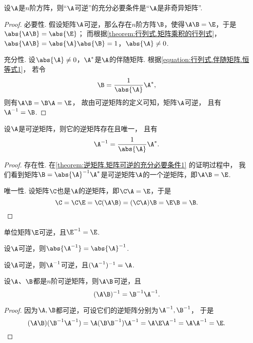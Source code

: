 \begin{theorem}\label{theorem:逆矩阵.矩阵可逆的充分必要条件1}
设\(\A\)是\(n\)阶方阵，则“\(\A\)可逆”的充分必要条件是“\(\A\)是非奇异矩阵”.
\begin{proof}
必要性.
假设矩阵\(\A\)可逆，那么存在\(n\)阶方阵\(\B\)，使得\(\A\B=\E\)，于是\(\abs{\A\B}=\abs{\E}\)；
而根据\cref{theorem:行列式.矩阵乘积的行列式}，
\(\abs{\A\B}=\abs{\A}\abs{\B}=1\)，\(\abs{\A}\neq0\).

充分性.
设\(\abs{\A}\neq0\)，\(\A^*\)是\(\A\)的伴随矩阵.
根据\cref{equation:行列式.伴随矩阵.恒等式1}，
若令\[
	\B=\frac{1}{\abs{\A}} \A^*,
\]
则有\(\A\B = \B\A = \E\)，
故由可逆矩阵的定义可知，矩阵\(\A\)可逆，
且有\(\A^{-1} = \B\).
\end{proof}
\end{theorem}

\begin{property}\label{theorem:逆矩阵.逆矩阵的唯一性}
设\(\A\)是可逆矩阵，则它的逆矩阵存在且唯一，
且有\begin{equation}
	\A^{-1}=\frac{1}{\abs{\A}}\A^*.
\end{equation}
\begin{proof}
存在性.
在\cref{theorem:逆矩阵.矩阵可逆的充分必要条件1} 的证明过程中，
我们看到矩阵\(\B=\abs{\A}^{-1} \A^*\)是可逆矩阵\(\A\)的一个逆矩阵，即\(\A\B=\E\).

唯一性.
设矩阵\(\C\)也是\(\A\)的逆矩阵，即\(\C\A=\E\)，于是\[
	\C=\C\E=\C(\A\B)=(\C\A)\B=\E\B=\B.
	\qedhere
\]
\end{proof}
\end{property}

\begin{property}\label{theorem:逆矩阵.单位矩阵可逆}
单位矩阵\(\E\)可逆，且\(\E^{-1}=\E\).
\end{property}

\begin{property}\label{theorem:逆矩阵.逆矩阵的行列式}
设\(\A\)可逆，则\(\abs{\A^{-1}}=\abs{\A}^{-1}\).
\end{property}

\begin{property}\label{theorem:逆矩阵.逆矩阵的逆}
设\(\A\)可逆，则\(\A^{-1}\)可逆，且\((\A^{-1})^{-1}=\A\).
\end{property}

\begin{property}\label{theorem:逆矩阵.矩阵乘积的逆1}
设\(\A\)、\(\B\)都是\(n\)阶可逆矩阵，则\(\A\B\)可逆，且\begin{equation}
(\A \B)^{-1} = \B^{-1} \A^{-1}.
\end{equation}
\begin{proof}
因为\(\A,\B\)都可逆，可设它们的逆矩阵分别为\(\A^{-1},\B^{-1}\)，
于是\[
	(\A\B)(\B^{-1}\A^{-1})
	= \A(\B\B^{-1})\A^{-1}
	= \A\E\A^{-1}
	= \A\A^{-1}
	= \E.
	\qedhere
\]
\end{proof}
\end{property}

